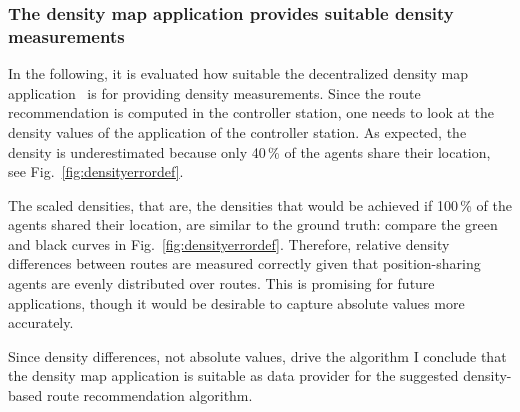 \subsubsection{The density map application provides suitable density measurements}


In the following, it is evaluated how suitable the decentralized density map application~\cite{schuhbaeck-2023-com} is for providing density measurements. Since the route recommendation is computed in the controller station, one needs to look at the density values of the application of the controller station. As expected, the density is underestimated because only 40\,\% of the agents share their location, see Fig.~\ref{fig:densityerrordef}. 

The scaled densities, that are, the densities that would be achieved if 100\,\% of the agents shared their location, are similar to the ground truth: compare the green and black curves in Fig.~\ref{fig:densityerrordef}. Therefore, relative density differences between routes are measured correctly given that position-sharing agents are evenly distributed over routes. This is promising for future applications, though it would be desirable to capture absolute values more accurately. 


Since density differences, not absolute values, drive the algorithm I conclude that the density map application is suitable as data provider for the suggested density-based route recommendation algorithm.


 

